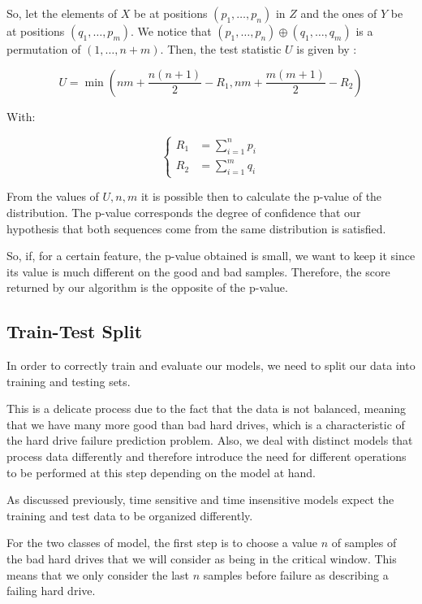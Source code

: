 So, let the elements of $X$ be at positions $(p_1, \dots, p_n)$ in $Z$ and the ones of $Y$ be at positions $(q_1, \dots, p_m)$.
We notice that $(p_1, \dots, p_n) \oplus (q_1, \dots, q_m)$ is a permutation of $(1,\dots,n+m)$.
Then, the test statistic $U$ is given by \cite{macfarland2016mann}:

\begin{equation}
  U = \min\left(nm + \dfrac{n(n+1)}{2} - R_1, nm + \dfrac{m(m+1)}{2} - R_2\right)
\end{equation}

With:

\begin{equation}
  \begin{cases}
    R_1 &= \sum_{i=1}^{n}p_i \\
    R_2 &= \sum_{i=1}^{m}q_i
  \end{cases}
\end{equation}

From the values of $U, n, m$ it is possible then to calculate the p-value of the distribution.
The p-value corresponds the degree of confidence that our hypothesis that both sequences come from the same distribution is satisfied.

So, if, for a certain feature, the p-value obtained is small, we want to keep it since its value is much different on the good and bad samples.
Therefore, the score returned by our algorithm is the opposite of the p-value.

\subsection{Train-Test Split}\label{subsec:train_test_split}

In order to correctly train and evaluate our models, we need to split our data into training and testing sets.

This is a delicate process due to the fact that the data is not balanced, meaning that we have many more good than bad hard drives, which is a characteristic of the hard drive failure prediction problem.
Also, we deal with distinct models that process data differently and therefore introduce the need for different operations to be performed at this step depending on the model at hand.

As discussed previously, time sensitive and time insensitive models expect the training and test data to be organized differently.

For the two classes of model, the first step is to choose a value $n$ of samples of the bad hard drives that we will consider as being in the critical window.
This means that we only consider the last $n$ samples before failure as describing a failing hard drive.

